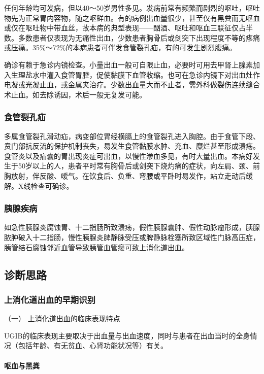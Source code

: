 任何年龄均可发病，但以40～50岁男性多见。发病前常有频繁而剧烈的呕吐，呕吐物先为正常胃内容物，随之呕鲜血。有的病例出血量很少，甚至仅有黑粪而无呕血或仅在呕吐物中带血丝，故本病的典型表现------酗酒、呕吐和呕血三联征仅占半数。多数患者仅表现为无痛性出血，少数患者胸骨后或剑突下出现程度不等的疼痛或压痛。35\%～72\%的本病患者可伴发食管裂孔疝，有的可发生剧烈腹痛。

确诊有赖于急诊内镜检查。小量出血一般可自限止血，必要时可用去甲肾上腺素加入生理盐水中灌入食管胃腔，促使黏膜下血管收缩。也可在急诊内镜下对出血灶作电凝或光凝止血，或金属夹治疗。少数出血量大而不止者，需外科做裂伤连续缝合术止血。如去除诱因，术后一般无复发可能。

\subsubsection{食管裂孔疝}

多属食管裂孔滑动疝，病变部位胃经横膈上的食管裂孔进入胸腔。由于食管下段、贲门部抗反流的保护机制丧失，易发生食管黏膜水肿、充血、糜烂甚至形成溃疡。食管炎以及疝囊的胃出现炎症可出血，以慢性渗血多见，有时大量出血。本病好发生于50岁以上的人，患者平时常有胸骨后或剑突下烧灼痛的症状，向左肩、颈、前胸放射，伴反酸、嗳气。在饮食后、负重、弯腰或平卧时易发作，站立走动后缓解。X线检查可确诊。

\subsubsection{胰腺疾病}

如急性胰腺炎腐蚀胃、十二指肠所致溃疡，假性胰腺囊肿、假性动脉瘤形成，胰腺脓肿破入十二指肠，慢性胰腺炎脾静脉受压或脾静脉栓塞所致区域性门脉高压症，胰管结石腐蚀邻近血管导致胰管血管瘘可致上消化道出血。

\subsection{诊断思路}

\subsubsection{上消化道出血的早期识别}

\hypertarget{text00032.htmlux5cux23CHP1-13-1-4-1-1}{}
（一） 上消化道出血的临床表现特点

UGIB的临床表现主要取决于出血量与出血速度，同时与患者在出血当时的全身情况（包括年龄、有无贫血、心肾功能状况等）有关。

\paragraph{呕血与黑粪}

